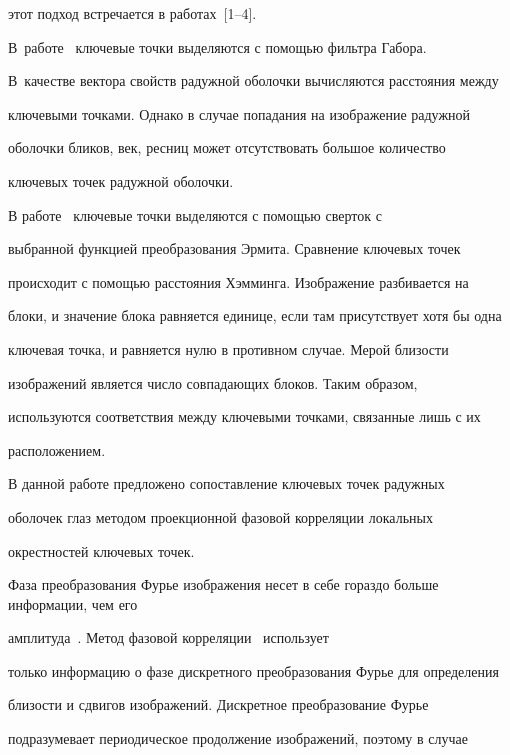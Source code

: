 этот подход встречается в работах~[1--4].





В~работе~\cite{1-pav} ключевые точки выделяются с помощью фильтра Габора. 


В~качестве вектора свойств радужной оболочки вычисляются расстояния между 


ключевыми точками. Однако в случае попадания на изображение радужной 


оболочки бликов, век, ресниц может отсутствовать большое количество 


ключевых точек радужной оболочки.





В работе~\cite{4-pav} ключевые точки выделяются с помощью сверток с 


выбранной функцией преобразования Эрмита. Сравнение ключевых точек 


происходит с помощью расстояния Хэмминга. Изображение разбивается на 


блоки, и значение блока равняется единице, если там присутствует хотя бы одна 


ключевая точка, и равняется нулю в противном случае. Мерой близости 


изображений является число совпадающих блоков. Таким образом, 


используются соответствия между ключевыми точками, связанные лишь с их 


расположением. 





В данной работе предложено сопоставление ключевых точек радужных 


оболочек глаз методом проекционной фазовой корреляции локальных 


окрестностей ключевых точек. 





Фаза преобразования Фурье изображения несет в себе гораздо больше информации, чем его 


амплитуда~\cite{5-pav}. Метод фазовой корреляции~\cite{6-pav, 7-pav} использует 


только информацию о фазе дискретного преобразования Фурье для определения 


близости и сдвигов изображений. Дискретное преобразование Фурье 


подразумевает периодическое продолжение изображений, поэтому в случае 


